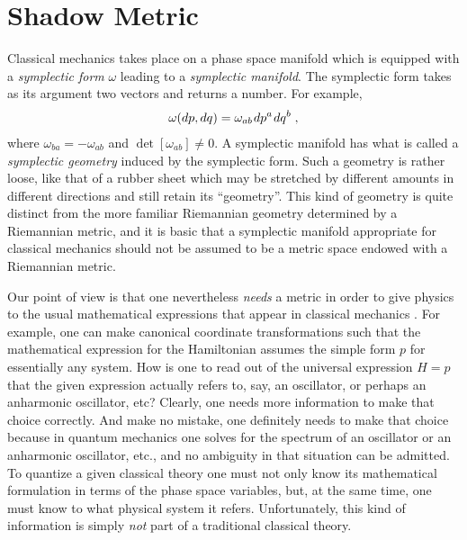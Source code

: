 \documentclass[12pt]{article}
\def\s{\hskip.08em}
\def\bn{\begin{eqnarray}}     %
\def\en{\end{eqnarray}}       %
\begin{document}
\section{Shadow Metric}
Classical mechanics takes place on a phase space manifold which is 
equipped with a {\it symplectic form} $\omega$ leading to a 
{\it symplectic manifold}. The symplectic form takes as its argument 
two vectors and returns a number. For example, 
  \bn \omega(dp,dq)=\omega_{ab}\s dp^a\s dq^b\;,  \en
where $\omega_{ba}=-\omega_{ab}$ and $\det[\omega_{ab}]\not=0$. A 
symplectic manifold has what is called a 
{\it symplectic geometry} induced by the symplectic form. Such a 
geometry is rather
loose, like that of a rubber sheet which may be stretched by different 
amounts in different directions and still retain its ``geometry''. This 
kind of geometry is quite distinct from the more familiar Riemannian 
geometry determined by a Riemannian metric, and it is basic that a 
symplectic manifold appropriate for classical mechanics should not be 
assumed to be a metric space endowed with a Riemannian metric.

Our point of view is that one nevertheless {\it needs} a metric in order 
to give physics to the usual mathematical expressions that appear in 
classical mechanics \cite{kla77}. For example, one can make canonical 
coordinate transformations such that the mathematical expression for the 
Hamiltonian assumes the simple form $p$ for essentially any system. How 
is one to read out of the universal expression $H=p$ that the given 
expression actually refers to, say, an oscillator, or perhaps an 
anharmonic oscillator, etc? Clearly, one needs more information to make 
that choice correctly. And make no mistake, one definitely needs to make 
that choice because in quantum mechanics one solves for the spectrum of an 
oscillator or an anharmonic oscillator, etc., and no ambiguity in that 
situation can be admitted. To quantize a given classical theory one must 
not only know its mathematical formulation in terms of the phase space 
variables, but, at the same time, one must know to what physical system 
it refers. Unfortunately, this kind of information is simply {\it not} 
part of a traditional classical theory.
\end{document}

